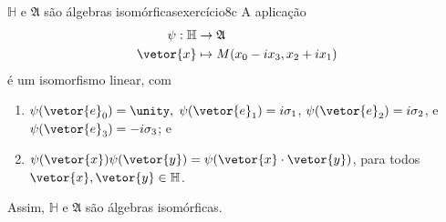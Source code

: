 \begin{proposition}{\(\mathbb{H}\) e \(\mathfrak{A}\) são álgebras isomórficas}{exercício8c}
    A aplicação
    \begin{align*}
        \psi : \mathbb{H} &\to \mathfrak{A}\\
                \vetor{x} &\mapsto M(x_0 - i x_3, x_2 + ix_1)
    \end{align*}
    é um isomorfismo linear, com
    \begin{enumerate}[label=(\alph*)]
        \item \(\psi(\vetor{e}_0) = \unity,\) \(\psi(\vetor{e}_1) = i \sigma_1\), \(\psi(\vetor{e}_2) = i \sigma_2\), e \(\psi(\vetor{e}_3) =-i \sigma_3\); e
        \item \(\psi(\vetor{x})\psi(\vetor{y}) = \psi(\vetor{x}\cdot\vetor{y})\), para todos \(\vetor{x}, \vetor{y} \in \mathbb{H}\).
    \end{enumerate}
    Assim, \(\mathbb{H}\) e \(\mathfrak{A}\) são álgebras isomórficas.
\end{proposition}
